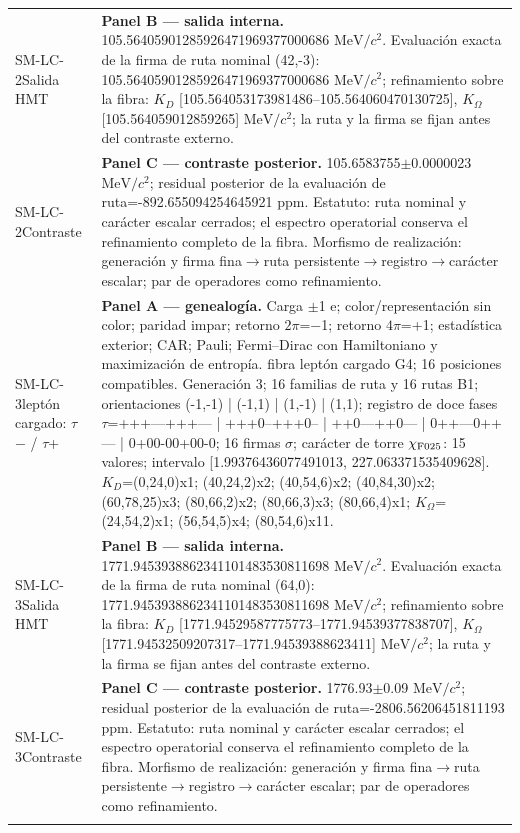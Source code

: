 \begin{longtable}{@{}>{\raggedright\arraybackslash}p{2.55cm}>{\raggedright\arraybackslash}p{11.75cm}@{}}
SM-LC-2\newline Salida HMT & \textbf{Panel B --- salida interna. }105.56405901285926471969377000686 \(\mathrm{MeV}/c^2\). Evaluación exacta de la firma de ruta nominal (42,-3): 105.56405901285926471969377000686 \(\mathrm{MeV}/c^2\); refinamiento sobre la fibra: \(K_D\) [105.564053173981486--105.564060470130725], \(K_{\Omega}\) [105.564059012859265] \(\mathrm{MeV}/c^2\); la ruta y la firma se fijan antes del contraste externo. \\
SM-LC-2\newline Contraste & \textbf{Panel C --- contraste posterior. }105.6583755\(\pm\)0.0000023 \(\mathrm{MeV}/c^2\); residual posterior de la evaluación de ruta=-892.655094254645921 ppm. Estatuto: ruta nominal y carácter escalar cerrados; el espectro operatorial conserva el refinamiento completo de la fibra. Morfismo de realización: generación y firma fina\(\to\)\allowbreak{}ruta persistente\(\to\)\allowbreak{}registro\(\to\)\allowbreak{}carácter escalar; par de operadores como refinamiento. \\\addlinespace[2pt]
SM-LC-3\newline leptón cargado: \(\tau\)\(-\) / \(\tau\)+ & \textbf{Panel A --- genealogía. }Carga \(\pm\)1 e; color/representación sin color; paridad impar; retorno \(2\pi\)=\(-\)1; retorno \(4\pi\)=+1; estadística exterior; CAR; Pauli; Fermi--Dirac con Hamiltoniano y maximización de entropía. fibra leptón cargado G4; 16 posiciones compatibles. Generación 3; 16 familias de ruta y 16 rutas B1; orientaciones (-1,-1) | (-1,1) | (1,-1) | (1,1); registro de doce fases \(\tau\)=+++---+++--- | +++0--+++0-- | ++0---++0--- | 0++---0++--- | 0+00-00+00-0; 16 firmas \(\sigma\); carácter de torre \(\chi_{\rm F025}\): 15 valores; intervalo [1.99376436077491013, 227.063371535409628]. \(K_D\)=(0,24,0)x1; (40,24,2)x2; (40,54,6)x2; (40,84,30)x2; (60,78,25)x3; (80,66,2)x2; (80,66,3)x3; (80,66,4)x1; \(K_{\Omega}\)=(24,54,2)x1; (56,54,5)x4; (80,54,6)x11. \\
SM-LC-3\newline Salida HMT & \textbf{Panel B --- salida interna. }1771.9453938862341101483530811698 \(\mathrm{MeV}/c^2\). Evaluación exacta de la firma de ruta nominal (64,0): 1771.9453938862341101483530811698 \(\mathrm{MeV}/c^2\); refinamiento sobre la fibra: \(K_D\) [1771.94529587775773--1771.94539377838707], \(K_{\Omega}\) [1771.94532509207317--1771.94539388623411] \(\mathrm{MeV}/c^2\); la ruta y la firma se fijan antes del contraste externo. \\
SM-LC-3\newline Contraste & \textbf{Panel C --- contraste posterior. }1776.93\(\pm\)0.09 \(\mathrm{MeV}/c^2\); residual posterior de la evaluación de ruta=-2806.56206451811193 ppm. Estatuto: ruta nominal y carácter escalar cerrados; el espectro operatorial conserva el refinamiento completo de la fibra. Morfismo de realización: generación y firma fina\(\to\)\allowbreak{}ruta persistente\(\to\)\allowbreak{}registro\(\to\)\allowbreak{}carácter escalar; par de operadores como refinamiento. \\\addlinespace[2pt]

\end{longtable}
